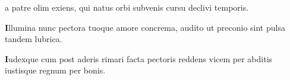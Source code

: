 \begin{multicols*}{2}
{a patre olim exiens,
qui natus orbi subvenis
cursu declivi temporis.
\par {\bfseries \color{Red} I}llumina nunc pectora
tuoque amore concrema,
audito ut preconio
sint pulsa tandem lubrica.
\par {\bfseries \color{Blue} I}udexque cum post aderis
rimari facta pectoris
reddens vicem per abditis
iustisque regnum per bonis.
}














\end{multicols*}